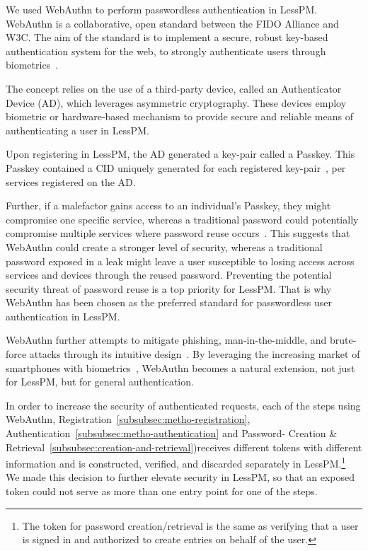 We used WebAuthn to perform passwordless authentication in LessPM\@.
WebAuthn is a collaborative, open standard between the FIDO Alliance and W3C\@.
The aim of the standard is to implement a secure, robust key-based
authentication system for the web, to strongly authenticate users through
biometrics~\cite{webauthn_level_2}.

The concept relies on the use of a third-party device, called an
Authenticator Device (AD), which leverages asymmetric cryptography.
These devices employ biometric or hardware-based mechanism to provide secure
and reliable means of authenticating a user in LessPM\@.

Upon registering in LessPM, the AD generated a key-pair called a Passkey.
This Passkey contained a CID uniquely generated for each registered
key-pair~\cite{webauthn_credential_id,webauthn_public_key_credential}, per
services registered on the AD\@.

Further, if a malefactor gains access to an individual's Passkey, they might
compromise one specific service, whereas a traditional password could
potentially compromise multiple services where password reuse
occurs~\cite{wang2018next}.
This suggests that WebAuthn could create a stronger level of security, whereas
a traditional password exposed in a leak might leave a user susceptible to
losing access across services and devices through the reused password.
Preventing the potential security threat of password reuse is a top priority
for LessPM\@.
That is why WebAuthn has been chosen as the preferred standard for
passwordless user authentication in LessPM\@.

WebAuthn further attempts to mitigate phishing, man-in-the-middle, and
brute-force attacks through its intuitive design~\cite{webauthn_level_2}.
By leveraging the increasing market of smartphones with
biometrics~\cite{statista-biometric-transactions}, WebAuthn becomes a natural
extension, not just for LessPM, but for general authentication.

In order to increase the security of authenticated requests, each of the
steps using WebAuthn, Registration~\ref{subsubsec:metho-registration},
Authentication~\ref{subsubsec:metho-authentication} and
Password- Creation \& Retrieval~\ref{subsubsec:creation-and-retrieval})receives
different tokens with different information and is constructed, verified, and
discarded separately in LessPM.\footnote{
  The token for password creation/retrieval is the same as verifying that a user
  is signed in and authorized to create entries on behalf of the user.
}
We made this decision to further elevate security in LessPM, so that an
exposed token could not serve as more than one entry point for one of the steps.

